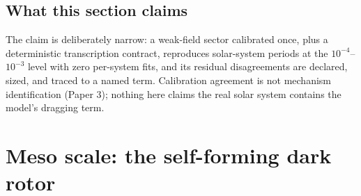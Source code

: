 \documentclass[aps,reprint,amsmath,amssymb,nofootinbib,superscriptaddress,floatfix]{revtex4-2}
\begin{document}
\subsection{What this section claims}

The claim is deliberately narrow: a weak-field sector calibrated once,
plus a deterministic transcription contract, reproduces solar-system
periods at the $10^{-4}$--$10^{-3}$ level with zero per-system fits,
and its residual disagreements are declared, sized, and traced to a
named term. Calibration agreement is not mechanism identification
(Paper 3); nothing here claims the real solar system contains the
model's dragging term.

\section{Meso scale: the self-forming dark rotor}
\label{sec:meso}
\end{document}
